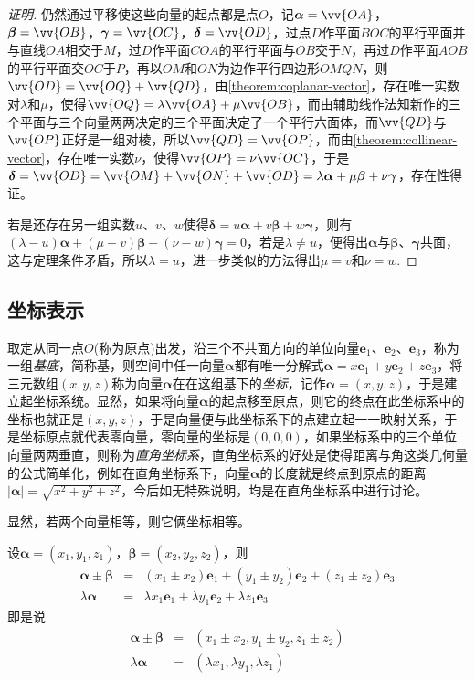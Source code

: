 \begin{proof}[证明]
  仍然通过平移使这些向量的起点都是点$O$，记$\bm{\alpha}=\vv{OA}$，$\bm{\beta}=\vv{OB}$，$\bm{\gamma}=\vv{OC}$，$\bm{\delta}=\vv{OD}$，过点$D$作平面$BOC$的平行平面并与直线$OA$相交于$M$，过$D$作平面$COA$的平行平面与$OB$交于$N$，再过$D$作平面$AOB$的平行平面交$OC$于$P$，再以$OM$和$ON$为边作平行四边形$OMQN$，则$\vv{OD}=\vv{OQ}+\vv{QD}$，由\autoref{theorem:coplanar-vector}，存在唯一实数对$\lambda$和$\mu$，使得$\vv{OQ}=\lambda \vv{OA} + \mu \vv{OB}$，而由辅助线作法知新作的三个平面与三个向量两两决定的三个平面决定了一个平行六面体，而$\vv{QD}$与$\vv{OP}$正好是一组对棱，所以$\vv{QD}=\vv{OP}$，而由\autoref{theorem:collinear-vector}，存在唯一实数$\nu$，使得$\vv{OP}=\nu \vv{OC}$，于是$\bm{\delta} = \vv{OD} = \vv{OM}+\vv{ON}+\vv{OD}=\lambda \bm{\alpha} + \mu \bm{\beta} + \nu \bm{\gamma}$，存在性得证。

  若是还存在另一组实数$u$、$v$、$w$使得$\bm{\delta} = u \bm{\alpha} + v \bm{\beta} + w \bm{\gamma}$，则有$(\lambda-u)\bm{\alpha}+(\mu-v)\bm{\beta}+(\nu-w)\bm{\gamma}=0$，若是$\lambda \neq u$，便得出$\bm{\alpha}$与$\bm{\beta}$、$\bm{\gamma}$共面，这与定理条件矛盾，所以$\lambda = u$，进一步类似的方法得出$\mu =v$和$\nu=w$.
\end{proof}


\subsection{坐标表示}
\label{sec:codrnation-of-vector}

取定从同一点$O$(称为原点)出发，沿三个不共面方向的单位向量$\bm{e}_1$、$\bm{e}_2$、$\bm{e}_3$，称为一组\emph{基底}，简称基，则空间中任一向量$\bm{\alpha}$都有唯一分解式$\bm{\alpha}=x\bm{e}_1+y\bm{e}_2+z\bm{e}_3$，将三元数组$(x,y,z)$称为向量$\bm{\alpha}$在在这组基下的\emph{坐标}，记作$\bm{\alpha}=(x,y,z)$，于是建立起坐标系统。显然，如果将向量$\bm{\alpha}$的起点移至原点，则它的终点在此坐标系中的坐标也就正是$(x,y,z)$，于是向量便与此坐标系下的点建立起一一映射关系，于是坐标原点就代表零向量，零向量的坐标是$(0,0,0)$，如果坐标系中的三个单位向量两两垂直，则称为\emph{直角坐标系}，直角坐标系的好处是使得距离与角这类几何量的公式简单化，例如在直角坐标系下，向量$\bm{\alpha}$的长度就是终点到原点的距离$|\bm{\alpha}| = \sqrt{x^2+y^2+z^2}$，今后如无特殊说明，均是在直角坐标系中进行讨论。

显然，若两个向量相等，则它俩坐标相等。

设$\bm{\alpha}=(x_1,y_1,z_1)$，$\bm{\beta}=(x_2,y_2,z_2)$，则
\begin{eqnarray*}
  \bm{\alpha} \pm \bm{\beta} & = & (x_1 \pm x_2)\bm{e}_1+(y_1 \pm y_2)\bm{e}_2 + (z_1 \pm z_2) \bm{e}_3 \\
  \lambda \bm{\alpha} & = & \lambda x_1 \bm{e}_1 + \lambda y_1 \bm{e}_2 + \lambda z_1 \bm{e}_3
\end{eqnarray*}
即是说
\begin{eqnarray*}
  \bm{\alpha} \pm \bm{\beta} & = & (x_1 \pm x_2, y_1 \pm y_2, z_1 \pm z_2) \\
  \lambda \bm{\alpha} & = & (\lambda x_1, \lambda y_1, \lambda z_1)
\end{eqnarray*}

